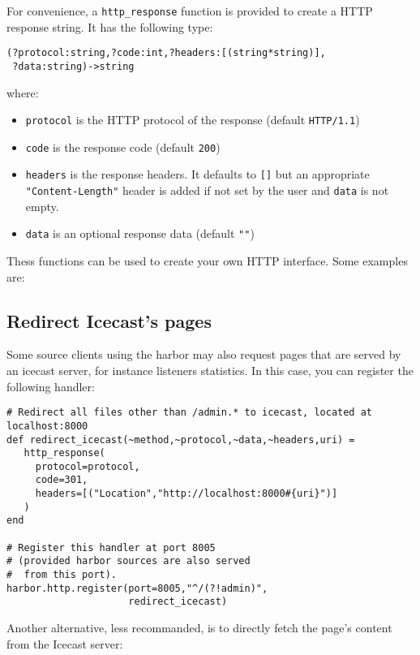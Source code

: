 For convenience, a \verb+http_response+ function is provided to 
create a HTTP response string. It has the following type:

\begin{verbatim}
(?protocol:string,?code:int,?headers:[(string*string)],
 ?data:string)->string
\end{verbatim}
where:

\begin{itemize}
\item \verb+protocol+ is the HTTP protocol of the response (default \verb+HTTP/1.1+)
\item \verb+code+ is the response code (default \verb+200+)
\item \verb+headers+ is the response headers. It defaults to \verb+[]+ but an appropriate \verb+"Content-Length"+ header is added if not set by the user and \verb+data+ is not empty.
\item \verb+data+ is an optional response data (default \verb+""+)

\end{itemize}
Thess functions can be used to create your own HTTP interface. Some examples
are:

\subsection{Redirect Icecast's pages}
Some source clients using the harbor may also request pages that
are served by an icecast server, for instance listeners statistics.
In this case, you can register the following handler:

\begin{verbatim}
# Redirect all files other than /admin.* to icecast, located at localhost:8000
def redirect_icecast(~method,~protocol,~data,~headers,uri) =
   http_response(
     protocol=protocol,
     code=301,
     headers=[("Location","http://localhost:8000#{uri}")]
   )
end

# Register this handler at port 8005
# (provided harbor sources are also served
#  from this port).
harbor.http.register(port=8005,"^/(?!admin)",
                     redirect_icecast)
\end{verbatim}
Another alternative, less recommanded, is to
directly fetch the page's content from the Icecast server:

